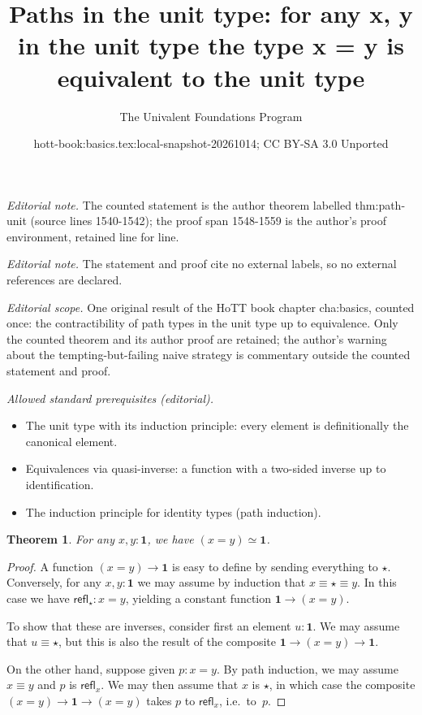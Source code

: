 \documentclass[10pt,a4paper]{article}
\title{Paths in the unit type: for any x, y in the unit type the type x = y is equivalent to the unit type}
\author{The Univalent Foundations Program}
\date{hott-book:basics.tex:local-snapshot-20261014; CC BY-SA 3.0 Unported}
\newcounter{chapter}
\newcommand{\jdeq}{\equiv}      %
\newcommand{\refl}[1]{\ensuremath{\mathsf{refl}_{#1}}\xspace}
\newcommand{\eqv}[2]{\ensuremath{#1 \simeq #2}\xspace}
\newcommand{\unit}{\ensuremath{\mathbf{1}}\xspace}
\newcommand{\ttt}{\ensuremath{\star}\xspace}
\newtheorem{thm}{Theorem}[section]
\theoremstyle{definition}
\theoremstyle{remark}
\numberwithin{equation}{section}
\begin{document}
\maketitle
\noindent\textit{Editorial note.} The counted statement is the author theorem labelled thm:path-unit (source lines 1540-1542); the proof span 1548-1559 is the author's proof environment, retained line for line.\par\medskip
\noindent\textit{Editorial note.} The statement and proof cite no external labels, so no external references are declared.\par\medskip
\noindent\textit{Editorial scope.} One original result of the HoTT book chapter cha:basics, counted once: the contractibility of path types in the unit type up to equivalence. Only the counted theorem and its author proof are retained; the author's warning about the tempting-but-failing naive strategy is commentary outside the counted statement and proof.\par\medskip
\noindent\textit{Allowed standard prerequisites (editorial).}\begin{itemize}
\item The unit type with its induction principle: every element is definitionally the canonical element.
\item Equivalences via quasi-inverse: a function with a two-sided inverse up to identification.
\item The induction principle for identity types (path induction).
\end{itemize}\medskip
\begin{thm}\label{thm:path-unit}
  For any $x,y:\unit$, we have $\eqv{(x=y)}{\unit}$.
\end{thm}

\begin{proof}
  A function $(x=y)\to\unit$ is easy to define by sending everything to \ttt.
  Conversely, for any $x,y:\unit$ we may assume by induction that $x\jdeq \ttt\jdeq y$.
  In this case we have $\refl{\ttt}:x=y$, yielding a constant function $\unit\to(x=y)$.

  To show that these are inverses, consider first an element $u:\unit$.
  We may assume that $u\jdeq\ttt$, but this is also the result of the composite $\unit \to (x=y)\to\unit$.

  On the other hand, suppose given $p:x=y$.
  By path induction, we may assume $x\jdeq y$ and $p$ is $\refl x$.
  We may then assume that $x$ is \ttt, in which case the composite $(x=y) \to \unit\to(x=y)$ takes $p$ to $\refl x$, i.e.\ to~$p$.
\end{proof}
\end{document}
